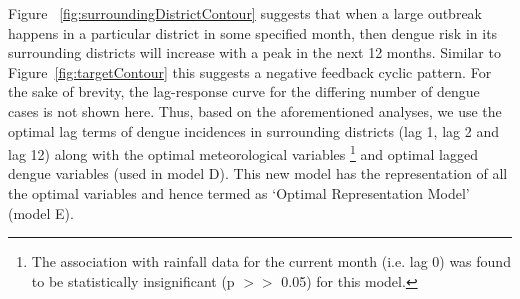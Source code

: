 \documentclass{bmcart}
\begin{document}
Figure ~\ref{fig:surroundingDistrictContour} suggests that when a large outbreak happens in a particular district in some specified month, then dengue risk in its surrounding districts will increase with a peak in the next 12 months. Similar to Figure~\ref{fig:targetContour} this suggests a negative feedback cyclic pattern. For the sake of brevity, the lag-response curve for the differing number of dengue cases is not shown here. Thus, based on the aforementioned analyses, we use the optimal lag terms of dengue incidences in surrounding districts (lag 1, lag 2 and lag 12) along with the optimal meteorological variables \footnote{The association with rainfall data for the current month (i.e. lag 0) was found to be statistically insignificant (p \(>\!\!>\) 0.05) for this model.} and optimal lagged dengue variables (used in model D). This new model has the representation of all the optimal variables and hence termed as `Optimal Representation Model' (model E).
\end{document}

